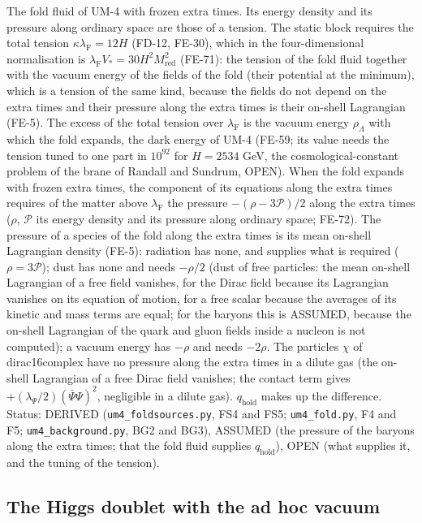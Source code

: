 \documentclass[
  10pt,
]{article}
\begin{document}
The fold fluid of UM-4 with frozen extra times. Its energy density and
its pressure along ordinary space are those of a tension. The static
block requires the total tension \(\kappa\lambda_{\mathrm{F}} = 12H\)
(FD-12, FE-30), which in the four-dimensional normalisation is
\(\lambda_{\mathrm{F}}V_* = 30H^2M_{\mathrm{red}}^2\) (FE-71): the
tension of the fold fluid together with the vacuum energy of the fields
of the fold (their potential at the minimum), which is a tension of the
same kind, because the fields do not depend on the extra times and their
pressure along the extra times is their on-shell Lagrangian (FE-5). The
excess of the total tension over \(\lambda_{\mathrm{F}}\) is the vacuum
energy \(\rho_\Lambda\) with which the fold expands, the dark energy of
UM-4 (FE-59; its value needs the tension tuned to one part in
\(10^{92}\) for \(H = 2534\) GeV, the cosmological-constant problem of
the brane of Randall and Sundrum, OPEN). When the fold expands with
frozen extra times, the component of its equations along the extra times
requires of the matter above \(\lambda_{\mathrm{F}}\) the pressure
\(-(\rho - 3\mathcal{P})/2\) along the extra times (\(\rho\),
\(\mathcal{P}\) its energy density and its pressure along ordinary
space; FE-72). The pressure of a species of the fold along the extra
times is its mean on-shell Lagrangian density (FE-5): radiation has
none, and supplies what is required (\(\rho = 3\mathcal{P}\)); dust has
none and needs \(-\rho/2\) (dust of free particles: the mean on-shell
Lagrangian of a free field vanishes, for the Dirac field because its
Lagrangian vanishes on its equation of motion, for a free scalar because
the averages of its kinetic and mass terms are equal; for the baryons
this is ASSUMED, because the on-shell Lagrangian of the quark and gluon
fields inside a nucleon is not computed); a vacuum energy has \(-\rho\)
and needs \(-2\rho\). The particles \(\chi\) of dirac16complex have no
pressure along the extra times in a dilute gas (the on-shell Lagrangian
of a free Dirac field vanishes; the contact term gives
\(+(\lambda_\Psi/2)(\bar\Psi\Psi)^2\), negligible in a dilute gas).
\(q_{\mathrm{hold}}\) makes up the difference. Status: DERIVED
(\texttt{um4\_foldsources.py}, FS4 and FS5; \texttt{um4\_fold.py}, F4
and F5; \texttt{um4\_background.py}, BG2 and BG3), ASSUMED (the pressure
of the baryons along the extra times; that the fold fluid supplies
\(q_{\mathrm{hold}}\)), OPEN (what supplies it, and the tuning of the
tension).

\hypertarget{the-higgs-doublet-with-the-ad-hoc-vacuum}{%
\subsection{The Higgs doublet with the ad hoc
vacuum}\label{the-higgs-doublet-with-the-ad-hoc-vacuum}}
\end{document}
